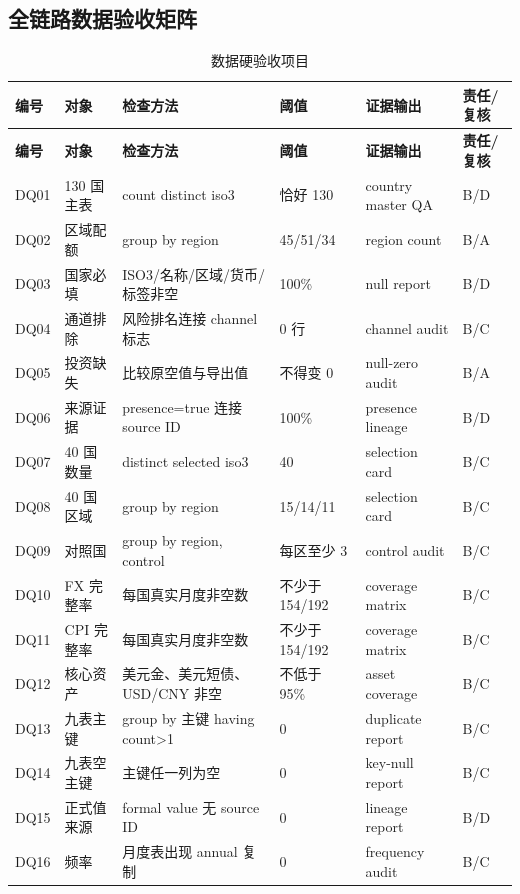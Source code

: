 \documentclass[UTF8,fontset=windows,12pt,openany]{ctexbook}
\begin{document}
\clearpage
\begin{landscape}
\chapter{全链路数据验收矩阵}
\begin{longtable}{p{1.7cm}p{4.0cm}p{4.6cm}p{3.0cm}p{3.2cm}p{2.7cm}}
\caption{数据硬验收项目}\label{tab:data-acceptance}\\
\toprule
\textbf{编号} & \textbf{对象} & \textbf{检查方法} & \textbf{阈值} & \textbf{证据输出} & \textbf{责任/复核}\\
\midrule
\endfirsthead
\toprule \textbf{编号} & \textbf{对象} & \textbf{检查方法} & \textbf{阈值} & \textbf{证据输出} & \textbf{责任/复核}\\ \midrule
\endhead
DQ01 & 130 国主表 & count distinct iso3 & 恰好 130 & country master QA & B/D\\
DQ02 & 区域配额 & group by region & 45/51/34 & region count & B/A\\
DQ03 & 国家必填 & ISO3/名称/区域/货币/标签非空 & 100\% & null report & B/D\\
DQ04 & 通道排除 & 风险排名连接 channel 标志 & 0 行 & channel audit & B/C\\
DQ05 & 投资缺失 & 比较原空值与导出值 & 不得变 0 & null-zero audit & B/A\\
DQ06 & 来源证据 & presence=true 连接 source ID & 100\% & presence lineage & B/D\\
DQ07 & 40 国数量 & distinct selected iso3 & 40 & selection card & B/C\\
DQ08 & 40 国区域 & group by region & 15/14/11 & selection card & B/C\\
DQ09 & 对照国 & group by region, control & 每区至少 3 & control audit & B/C\\
DQ10 & FX 完整率 & 每国真实月度非空数 & 不少于 154/192 & coverage matrix & B/C\\
DQ11 & CPI 完整率 & 每国真实月度非空数 & 不少于 154/192 & coverage matrix & B/C\\
DQ12 & 核心资产 & 美元金、美元短债、USD/CNY 非空 & 不低于 95\% & asset coverage & B/C\\
DQ13 & 九表主键 & group by 主键 having count>1 & 0 & duplicate report & B/C\\
DQ14 & 九表空主键 & 主键任一列为空 & 0 & key-null report & B/C\\
DQ15 & 正式值来源 & formal value 无 source ID & 0 & lineage report & B/D\\
DQ16 & 频率 & 月度表出现 annual 复制 & 0 & frequency audit & B/C\\

\end{longtable}
\end{landscape}
\end{document}
